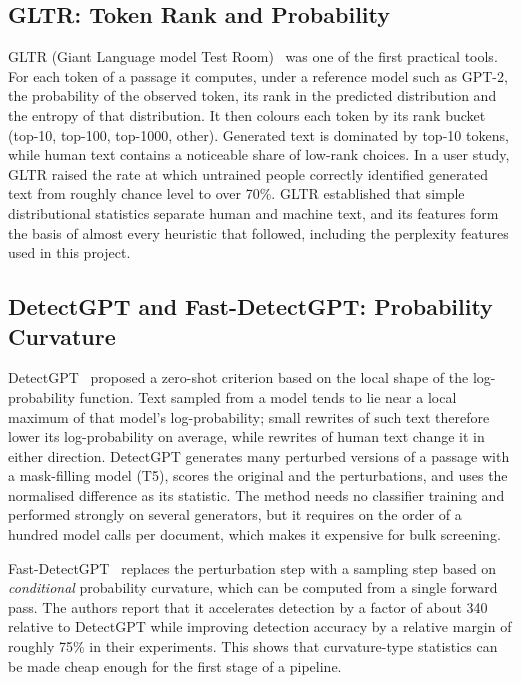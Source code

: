 \subsection{GLTR: Token Rank and Probability}

GLTR (Giant Language model Test Room)~\cite{gehrmann2019gltr} was one of the
first practical tools. For each token of a passage it computes, under a
reference model such as GPT-2, the probability of the observed token, its
rank in the predicted distribution and the entropy of that distribution. It
then colours each token by its rank bucket (top-10, top-100, top-1000, other).
Generated text is dominated by top-10 tokens, while human text contains a
noticeable share of low-rank choices. In a user study, GLTR raised the rate at
which untrained people correctly identified generated text from roughly chance
level to over 70\%. GLTR established that simple distributional statistics
separate human and machine text, and its features form the basis of almost
every heuristic that followed, including the perplexity features used in this
project.

\subsection{DetectGPT and Fast-DetectGPT: Probability Curvature}

DetectGPT~\cite{mitchell2023detectgpt} proposed a zero-shot criterion based on
the local shape of the log-probability function. Text sampled from a model
tends to lie near a local maximum of that model's log-probability; small
rewrites of such text therefore lower its log-probability on average, while
rewrites of human text change it in either direction. DetectGPT generates
many perturbed versions of a passage with a mask-filling model (T5), scores
the original and the perturbations, and uses the normalised difference as its
statistic. The method needs no classifier training and performed strongly on
several generators, but it requires on the order of a hundred model calls per
document, which makes it expensive for bulk screening.

Fast-DetectGPT~\cite{bao2024fast} replaces the perturbation step with a
sampling step based on \emph{conditional} probability curvature, which can be
computed from a single forward pass. The authors report that it accelerates
detection by a factor of about 340 relative to DetectGPT while improving
detection accuracy by a relative margin of roughly 75\% in their experiments.
This shows that curvature-type statistics can be made cheap enough for the
first stage of a pipeline.

